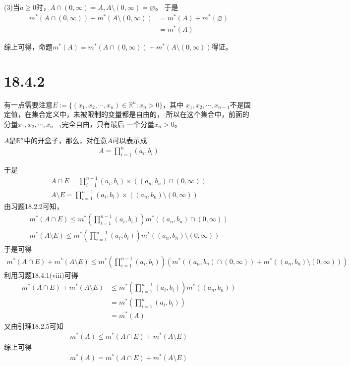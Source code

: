 \documentclass{article}
\begin{document}
(3)当$a \geq 0$时，$A \cap (0, \infty) = A, A \setminus (0, \infty) = \varnothing$。
于是
\begin{align*}
  m^{\ast}(A \cap (0, \infty)) + m^{\ast}(A \setminus (0, \infty))
   & = m^{\ast}(A) + m^{\ast}(\varnothing) \\
   & = m^{\ast}(A)
\end{align*}

综上可得，命题$m^{\ast}(A) = m^{\ast}(A \cap (0, \infty)) + m^{\ast}(A \setminus (0, \infty))$得证。

\section*{18.4.2}
有一点需要注意$E := \{(x_1, x_2, \cdots, x_n) \in \mathbb{R}^n: x_n > 0\}$，其中
$x_1, x_2, \cdots, x_{n - 1}$不是固定值，在集合定义中，未被限制的变量都是自由的，
所以在这个集合中，前面的分量$x_1, x_2, \cdots, x_{n - 1}$完全自由，只有最后
一个分量$x_n > 0$。

$A$是$\mathbb{R}^n$中的开盒子，那么，对任意$A$可以表示成
\begin{align*}
  A = \prod\limits_{i = 1}^n (a_i, b_i)
\end{align*}

于是
\begin{align*}
  A \cap E = \prod\limits_{i = 1}^{n - 1} (a_i, b_i) \times ((a_n, b_n) \cap (0, \infty)) \\
  A \setminus E = \prod\limits_{i = 1}^{n - 1} (a_i, b_i) \times ((a_n, b_n) \setminus (0, \infty))
\end{align*}
由习题18.2.2可知，
\begin{align*}
  m^{\ast}(A \cap E) \leq m^{\ast}(\prod\limits_{i = 1}^{n - 1} (a_i, b_i))m^{\ast}( (a_n, b_n) \cap (0, \infty)) \\
  m^{\ast}(A \setminus E) \leq m^{\ast}(\prod\limits_{i = 1}^{n - 1} (a_i, b_i))m^{\ast}( (a_n, b_n) \setminus (0, \infty))
\end{align*}
于是可得
\begin{align*}
  m^{\ast}(A \cap E) + m^{\ast}(A \setminus E) \leq m^{\ast}(\prod\limits_{i = 1}^{n - 1} (a_i, b_i))(m^{\ast}( (a_n, b_n) \cap (0, \infty)) + m^{\ast}( (a_n, b_n) \setminus (0, \infty)))
\end{align*}
利用习题18.4.1(viii)可得
\begin{align*}
  m^{\ast}(A \cap E) + m^{\ast}(A \setminus E) & \leq m^{\ast}(\prod\limits_{i = 1}^{n - 1} (a_i, b_i))m^{\ast}((a_n, b_n)) \\
                                               & = m^{\ast}(\prod\limits_{i = 1}^{n} (a_i, b_i))                            \\
                                               & = m^{\ast}(A)
\end{align*}
又由引理18.2.5可知
\begin{align*}
  m^{\ast}(A) \leq m^{\ast}(A \cap E) + m^{\ast}(A \setminus E)
\end{align*}
综上可得
\begin{align*}
  m^{\ast}(A) = m^{\ast}(A \cap E) + m^{\ast}(A \setminus E)
\end{align*}
\end{document}
